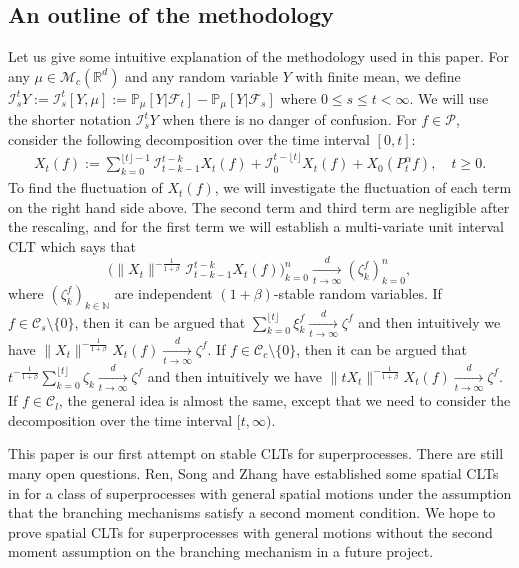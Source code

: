 \documentclass[12pt,a4paper]{amsart}
\theoremstyle{plain}
\theoremstyle{definition}
\numberwithin{equation}{section}
\begin{document}
\subsection{An outline of the methodology}
Let us give some intuitive explanation of the methodology used in this paper.
For any $\mu\in \mathcal M_c(\mathbb R^d)$ and any random variable $Y$ with finite mean, we define
$
  \mathcal I_s^t Y
  := \mathcal I_s^t [Y, \mu]
  := \mathbb P_\mu[Y|\mathscr F_t] - \mathbb P_\mu[Y|\mathscr F_s]
$
  where $0 \leq s \leq t <\infty.$
We will use the shorter notation $\mathcal I_s^t Y$ when there is no danger of confusion.
For $f\in \mathcal{P}$, consider the following decomposition over the time interval $[0,t]$:
\begin{align}
  X_t(f)
  := \sum_{k=0}^{\lfloor t \rfloor-1} \mathcal I_{t-k-1}^{t-k} X_t (f)+\mathcal I_0^{t-\lfloor t \rfloor} X_t(f) + X_0( P^\alpha_tf),
  \quad t\geq 0.
\end{align}
To find the fluctuation of $X_t(f)$, we will investigate the fluctuation of each term on the right hand side above.
The second term and third term are negligible after the rescaling, and for the first term we will establish
a multi-variate unit interval CLT  which says that
\[
  \Big( \|X_t\|^{-\frac{1}{1+\beta}}\mathcal I^{t-k}_{t-k-1} X_t(f) \Big)_{k=0}^n
  \xrightarrow [t\to \infty]{d} (\zeta^f_k)_{k=0}^n,
\]
where $(\zeta^f_k)_{k \in \mathbb N}$ are independent $(1+\beta)$-stable random variables.
If $f \in \mathcal C_s\setminus\{0\}$, then it can be argued that $\sum_{k=0}^{\lfloor t \rfloor} \xi^f_k \xrightarrow[t\to \infty]{d} \zeta^f$ and then intuitively we have
\(
  \|X_t\|^{-\frac{1}{1+\beta}}  X_t(f)
  \xrightarrow[t\to \infty]{d} \zeta^f.
  \)
If $f \in \mathcal C_c \setminus \{0\}$, then it can be argued that
\(
t^{-\frac{1}{1+\beta}} \sum_{k=0}^{\lfloor t\rfloor} \zeta_k \xrightarrow[t\to \infty]{ d} \zeta^f
\)
and then intuitively we have
\(
\|tX_t\|^{-\frac{1}{1+\beta}}  X_t(f)
\xrightarrow[t\to \infty]{d} \zeta^f.
\)
If $f\in \mathcal C_l$, the general idea is almost the same, except that we need to consider the decomposition over the time interval $[t,\infty)$.


This paper is our first attempt on stable CLTs for superprocesses.
There are still many open questions.
Ren, Song and Zhang have established some spatial  CLTs in \cite{RenSongZhang2015Central} for a class of superprocesses with general spatial motions under
the assumption that the branching mechanisms satisfy a second moment condition.
We hope to prove spatial CLTs for superprocesses with general motions without the second moment assumption on the branching mechanism in a future project.
\end{document}
